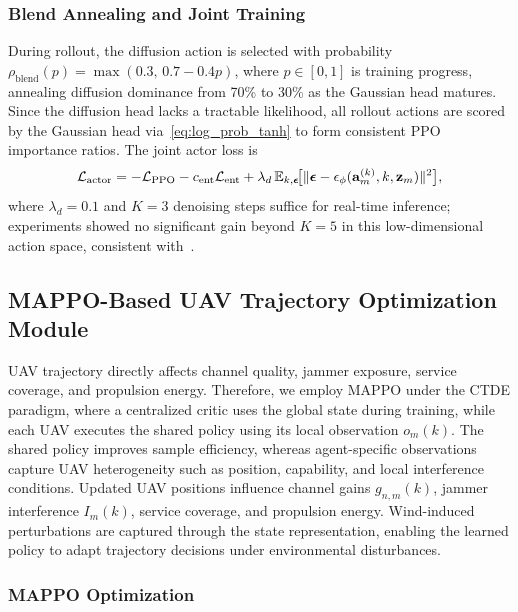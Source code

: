 \documentclass[journal]{IEEEtran}
\begin{document}
\subsubsection{Blend Annealing and Joint Training}

During rollout, the diffusion action is selected with probability 
$\rho_{\mathrm{blend}}(p)=\max(0.3,\,0.7-0.4p)$, where $p\in[0,1]$ 
is training progress, annealing diffusion dominance from 70\% to 30\% 
as the Gaussian head matures. Since the diffusion head lacks a 
tractable likelihood, all rollout actions are scored by the Gaussian 
head via~\eqref{eq:log_prob_tanh} to form consistent PPO importance 
ratios. The joint actor loss is
\begin{equation}
\small
\mathcal{L}_{\mathrm{actor}}
= -\mathcal{L}_{\mathrm{PPO}}
- c_{\mathrm{ent}}\mathcal{L}_{\mathrm{ent}}
+ \lambda_d\,
\mathbb{E}_{k,\boldsymbol{\epsilon}}\!
\bigl[\|\boldsymbol{\epsilon}
- \epsilon_\phi(\mathbf{a}_m^{(k)},k,\mathbf{z}_m)\|^2\bigr],
\label{eq:actor_loss}
\end{equation}
where $\lambda_d=0.1$ and $K=3$ denoising steps suffice for 
real-time inference; experiments showed no significant gain beyond 
$K=5$ in this low-dimensional action space, consistent 
with~\cite{liang2025uav}.


\subsection{MAPPO-Based UAV Trajectory Optimization Module}

UAV trajectory directly affects channel quality, jammer exposure, service coverage, and propulsion energy. Therefore, we employ MAPPO under the CTDE paradigm, where a centralized critic uses the global state during training, while each UAV executes the shared policy using its local observation $o_m(k)$. The shared policy improves sample efficiency, whereas agent-specific observations capture UAV heterogeneity such as position, capability, and local interference conditions. Updated UAV positions influence channel gains $g_{n,m}(k)$, jammer interference $I_m(k)$, service coverage, and propulsion energy. Wind-induced perturbations are captured through the state representation, enabling the learned policy to adapt trajectory decisions under environmental disturbances.

\subsubsection{MAPPO Optimization}
\end{document}
